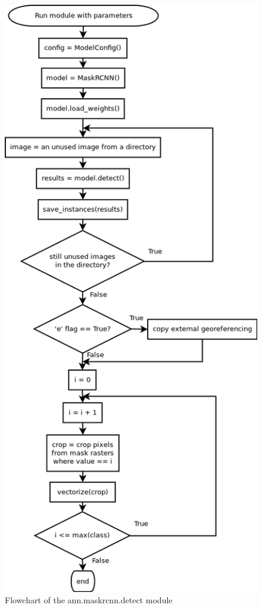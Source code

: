\begin{figure}[H]
   \centering
	\includegraphics[width=0.6\linewidth]{./pictures/detect_dia.png}
	\caption[ann.maskrcnn.detect flowchart]{Flowchart of the ann.maskrcnn.detect module}
      \label{fig:detect}
\end{figure}


